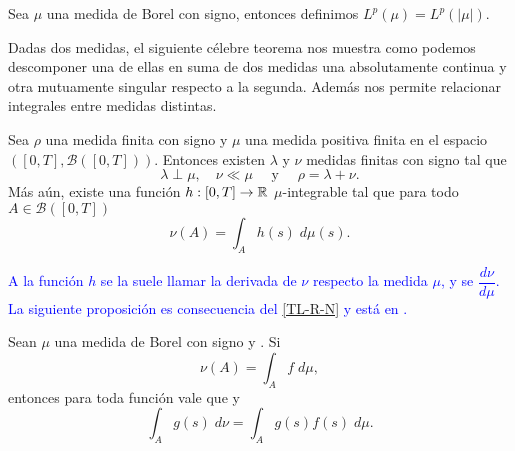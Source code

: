 \begin{defi}
	Sea $\mu$ una medida de Borel con signo, entonces definimos $L^p(\mu)=L^p(|\mu|)$.   
\end{defi}

{\color{green}
Dadas dos medidas, el siguiente célebre teorema nos muestra  como podemos descomponer una de ellas en suma de dos medidas una absolutamente continua y otra mutuamente singular respecto a la segunda. Además  nos permite relacionar integrales entre medidas distintas. 
}


\begin{thm}\label{TL-R-N}\normalmarginpar{}\reversemarginpar
	Sea $\rho$ una medida finita con signo y $\mu$ una medida positiva finita en el espacio $\left( [0,T], \mathscr{B}([0,T])\right) $. Entonces existen $\lambda$ y $\nu$ medidas finitas con signo tal que 
	\begin{equation*}
		\lambda\perp\mu, \quad \nu\ll\mu  \quad \text{ y }\quad \rho=\lambda+\nu.
	\end{equation*}
Más aún, existe una función $h:[0,T]\to\mathbb{R}$ $\mu$-integrable tal que para todo $A\in \mathscr{B}([0,T])$
\begin{equation*}
	\nu(A)=\int_A h(s)\;d\mu(s).
\end{equation*}
\end{thm}
\textcolor{blue}{A la función $h$ se la suele llamar la derivada  de  $\nu$ respecto  la medida $\mu$, y se   $\dfrac{d\nu}{d\mu}$.
\normalmarginpar{}La siguiente proposición es consecuencia del  \ref{TL-R-N} y está  en \cite[Proposición 3.9]{folland}.}




\begin{prop}\label{prop:medida_int}
    \label{ob1}
	Sean $\mu$ una medida de Borel con signo  y  . Si   $$\nu(A)=\int_A f\; d\mu,$$ entonces  para toda función  vale que  y 
	\begin{equation*}
	    \int_A g(s)\;d\nu=\int_Ag(s)f(s)\;d\mu.
	\end{equation*}

\end{prop}


